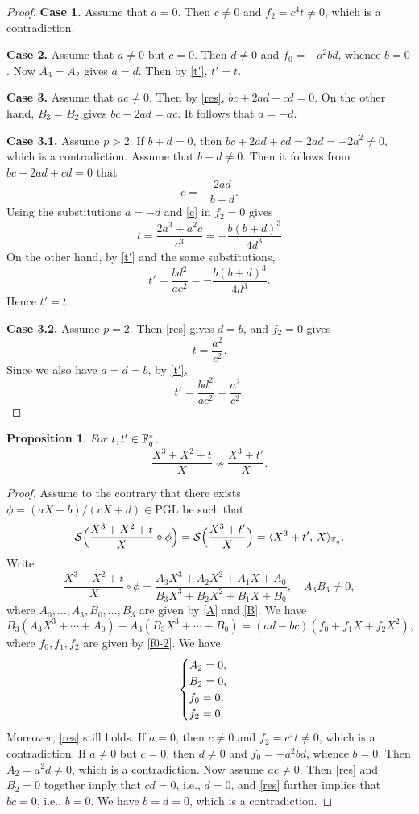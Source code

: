 \documentclass{amsart}
\newtheorem{prop}[thm]{Proposition}
\numberwithin{equation}{section}
\theoremstyle{definition}
\newcommand{\f}{\Bbb F}
\newcommand{\pgl}{\mathrm{PGL}}
\begin{document}
\begin{proof}
\medskip
{\bf Case 1.} Assume that $a=0$. Then $c\ne 0$ and $f_2=c^4t\ne 0$, which is a contradiction.

\medskip
{\bf Case 2.} Assume that $a\ne0$ but $c=0$. Then $d\ne 0$ and $f_0=-a^2bd$, whence $b=0$. Now $A_3=A_2$ gives $a=d$. Then by \eqref{t'}, $t'=t$.

\medskip
{\bf Case 3.} Assume that $ac\ne0$. Then by \eqref{res}, $bc+2ad+cd=0$. On the other hand, $B_3=B_2$ gives $bc+2ad=ac$. It follows that $a=-d$.

\medskip
{\bf Case 3.1.} Assume $p>2$.
If $b+d=0$, then $bc+2ad+cd=2ad=-2a^2\ne 0$, which is a contradiction.
Assume that $b+d\ne0$. Then it follows from $bc+2ad+cd=0$ that
\begin{equation}\label{c}
c=-\frac{2ad}{b+d}.
\end{equation}
Using the substitutions $a=-d$ and \eqref{c} in $f_2=0$ gives
\[
t=\frac{2a^3+a^2c}{c^3}=-\frac{b(b+d)^3}{4d^3}
\]
On the other hand, by \eqref{t'} and the same substitutions,
\[
t'=\frac{bd^2}{ac^2}=-\frac{b(b+d)^3}{4d^3}.
\]
Hence $t'=t$.

\medskip
{\bf Case 3.2.} Assume $p=2$. Then \eqref{res} gives $d=b$, and $f_2=0$ gives 
\[
t=\frac{a^2}{c^2}.
\]
Since we also have $a=d=b$, by \eqref{t'},
\[
t'=\frac{bd^2}{ac^2}=\frac{a^2}{c^2}.
\]
\end{proof}

\begin{prop}\label{Proposition 1.3}
For $t,t'\in\f_q^*$,
\[
\frac{X^3+X^2+t}X\not\sim\frac{X^3+t'}X.
\]
\end{prop}

\begin{proof}
Assume to the contrary that there exists $\phi=(aX+b)/(cX+d)\in\pgl$ be such that
\[
\mathcal S\Bigl(\frac{X^3+X^2+t}X\circ\phi\Bigr)=\mathcal S\Bigl(\frac{X^3+t'}X\Bigr)=\langle X^3+t',\,X\rangle_{\f_q}.
\]
Write
\[
\frac{X^3+X^2+t}X\circ\phi=\frac{A_3X^3+A_2X^2+A_1X+A_0}{B_3X^3+B_2X^2+B_1X+B_0},\quad A_3B_3\ne 0,
\]
where $A_0,\dots,A_3,B_0,\dots,B_3$ are given by \eqref{A} and \eqref{B}. We have
\[
B_3(A_3X^3+\cdots+A_0)-A_3(B_3X^3+\cdots+B_0)=(ad-bc)(f_0+f_1X+f_2X^2),
\]
where $f_0,f_1,f_2$ are given by \eqref{f0-2}. We have
\[
\begin{cases}
A_2=0,\cr
B_2=0,\cr
f_0=0,\cr
f_2=0.
\end{cases}
\]
Moreover, \eqref{res} still holds. 
If $a=0$, then $c\ne 0$ and $f_2=c^4t\ne 0$, which is a contradiction.
If $a\ne 0$ but $c=0$, then $d\ne 0$ and $f_0=-a^2bd$, whence $b=0$. Then $A_2=a^2d\ne 0$, which is a contradiction.
Now assume $ac\ne 0$. Then \eqref{res} and $B_2=0$ together imply that $cd=0$, i.e., $d=0$, and \eqref{res} further implies that $bc=0$, i.e., $b=0$. We have $b=d=0$, which is a contradiction.
\end{proof}
\end{document}
